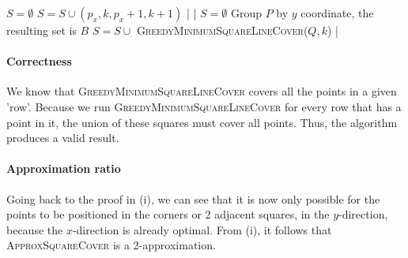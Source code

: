 \begin{enumerate}[(i)]
\begin{sourcecode}
$S = \emptyset$
		$S = S \cup (p_x, k, p_x + 1, k + 1)$
	|
|
\qend
{}
$S = \emptyset$
Group $P$ by $y$ coordinate, the resulting set is $B$
	$S = S \cup $ \textsc{GreedyMinimumSquareLineCover}($Q, k$)
|
\qend
\end{sourcecode}

		\paragraph{Correctness} We know that \textsc{GreedyMinimumSquareLineCover} covers all the points in a given 'row'.
			Because we run \textsc{GreedyMinimumSquareLineCover} for every row that has a point in it, the union of these squares must cover all points.
			Thus, the algorithm produces a valid result.

		\paragraph{Approximation ratio} Going back to the proof in (i), we can see that it is now only possible for the points to be positioned in the corners or 2 adjacent squares, in the $y$-direction, because the $x$-direction is already optimal.
			From (i), it follows that \textsc{ApproxSquareCover} is a 2-approximation.
\end{enumerate}
